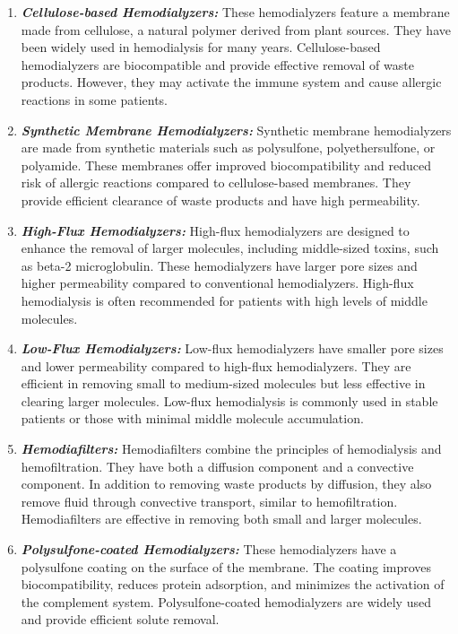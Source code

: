 \documentclass[12pt, a4paper]{article} %
\begin{document}
\begin{enumerate}[1)]
    \item \textbf{{\slshape Cellulose-based Hemodialyzers:}} These hemodialyzers feature a membrane made from cellulose, a natural polymer derived from plant sources. They have been widely used in hemodialysis for many years. Cellulose-based hemodialyzers are biocompatible and provide effective removal of waste products. However, they may activate the immune system and cause allergic reactions in some patients.
    
    \item \textbf{{\slshape Synthetic Membrane Hemodialyzers:}} Synthetic membrane hemodialyzers are made from synthetic materials such as polysulfone, polyethersulfone, or polyamide. These membranes offer improved biocompatibility and reduced risk of allergic reactions compared to cellulose-based membranes. They provide efficient clearance of waste products and have high permeability.
    
    \item \textbf{{\slshape High-Flux Hemodialyzers:}} High-flux hemodialyzers are designed to enhance the removal of larger molecules, including middle-sized toxins, such as beta-2 microglobulin. These hemodialyzers have larger pore sizes and higher permeability compared to conventional hemodialyzers. High-flux hemodialysis is often recommended for patients with high levels of middle molecules.
    
    \item \textbf{{\slshape Low-Flux Hemodialyzers:}} Low-flux hemodialyzers have smaller pore sizes and lower permeability compared to high-flux hemodialyzers. They are efficient in removing small to medium-sized molecules but less effective in clearing larger molecules. Low-flux hemodialysis is commonly used in stable patients or those with minimal middle molecule accumulation.
    
    \item \textbf{{\slshape Hemodiafilters:}} Hemodiafilters combine the principles of hemodialysis and hemofiltration. They have both a diffusion component and a convective component. In addition to removing waste products by diffusion, they also remove fluid through convective transport, similar to hemofiltration. Hemodiafilters are effective in removing both small and larger molecules.
    
    \item \textbf{{\slshape Polysulfone-coated Hemodialyzers:}} These hemodialyzers have a polysulfone coating on the surface of the membrane. The coating improves biocompatibility, reduces protein adsorption, and minimizes the activation of the complement system. Polysulfone-coated hemodialyzers are widely used and provide efficient solute removal.
\end{enumerate}
\end{document}
